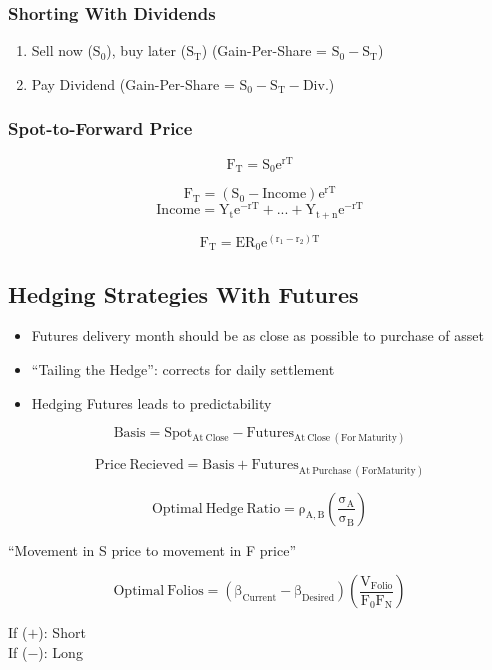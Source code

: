 \documentclass[11pt, english]{article}
\begin{document}
		\subsubsection{Shorting With Dividends}

	\begin{enumerate}        
        \setlength\itemsep{0cm}
		\item Sell now ($\mathrm{S_0}$), buy later ($\mathrm{S_T}$) (Gain-Per-Share = $\mathrm{S_0-S_T}$)
		\item Pay Dividend (Gain-Per-Share = $\mathrm{S_0-S_T-Div.}$)
	\end{enumerate}

		\subsubsection{Spot-to-Forward Price}

	$$\mathrm{F_T=S_0e^{rT}}$$

	$$\mathrm{F_T=(S_0-Income)e^{rT}}$$
	$$\mathrm{Income=Y_te^{-rT}+...+Y_{t+n}e^{-rT}}$$

	$$\mathrm{F_T=ER_0e^{(r_1-r_2)T}}$$

\newpage

	\subsection{Hedging Strategies With Futures}

	\begin{itemize}                                                              
        \setlength\itemsep{0cm}
		\item Futures delivery month should be as close as possible to purchase of asset
		\item ``Tailing the Hedge'': corrects for daily settlement
		\item Hedging Futures leads to predictability
	\end{itemize}

	$$\mathrm{Basis=Spot_{At\ Close}-Futures_{At\ Close\ (For\ Maturity)}}$$

	$$\mathrm{Price\ Recieved=Basis+Futures_{At\ Purchase\ (For Maturity)}}$$

	$$\mathrm{Optimal\ Hedge\ Ratio=\rho_{A,B}\left(\frac{\sigma_A}{\sigma_B}\right)}$$
	\begin{center}``Movement in S price to movement in F price''\end{center}

	$$\mathrm{Optimal\ Folios=\left(\beta_{Current}-\beta_{Desired}\right)\left(\frac{V_{Folio}}{F_0F_N}\right)}$$
	\begin{center}If ($+$): Short\\ If ($-$): Long\end{center}
\end{document}
